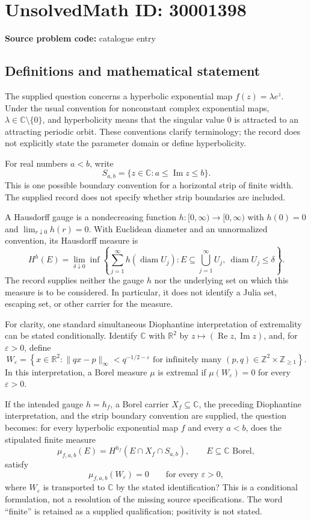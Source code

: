 \documentclass[11pt]{article}
\newcommand{\Z}{\mathbb{Z}}
\newcommand{\R}{\mathbb{R}}
\newcommand{\C}{\mathbb{C}}
\begin{document}
\section*{UnsolvedMath ID: 30001398}
\textbf{Source problem code:} catalogue entry
\subsection{Definitions and mathematical statement}
The supplied question concerns a hyperbolic exponential map \(f(z)=\lambda e^z\). Under the usual convention for nonconstant complex exponential maps, \(\lambda\in\C\setminus\{0\}\), and hyperbolicity means that the singular value \(0\) is attracted to an attracting periodic orbit. These conventions clarify terminology; the record does not explicitly state the parameter domain or define hyperbolicity.

For real numbers \(a<b\), write
\[
S_{a,b}=\{z\in\C:a\leq\operatorname{Im}z\leq b\}.
\]
This is one possible boundary convention for a horizontal strip of finite width. The supplied record does not specify whether strip boundaries are included.

A Hausdorff gauge is a nondecreasing function \(h:[0,\infty)\to[0,\infty)\) with \(h(0)=0\) and \(\lim_{r\downarrow0}h(r)=0\). With Euclidean diameter and an unnormalized convention, its Hausdorff measure is
\[
H^h(E)=\lim_{\delta\downarrow0}\inf\left\{\sum_{j=1}^{\infty}h(\operatorname{diam}U_j):E\subseteq\bigcup_{j=1}^{\infty}U_j,\ \operatorname{diam}U_j\leq\delta\right\}.
\]
The record supplies neither the gauge \(h\) nor the underlying set on which this measure is to be considered. In particular, it does not identify a Julia set, escaping set, or other carrier for the measure.

For clarity, one standard simultaneous Diophantine interpretation of extremality can be stated conditionally. Identify \(\C\) with \(\R^2\) by \(z\mapsto(\operatorname{Re}z,\operatorname{Im}z)\), and, for \(\varepsilon>0\), define
\[
W_\varepsilon=\left\{x\in\R^2:\|qx-p\|_\infty<q^{-1/2-\varepsilon}\text{ for infinitely many }(p,q)\in\Z^2\times\Z_{\geq1}\right\}.
\]
In this interpretation, a Borel measure \(\mu\) is extremal if \(\mu(W_\varepsilon)=0\) for every \(\varepsilon>0\).

If the intended gauge \(h=h_f\), a Borel carrier \(X_f\subseteq\C\), the preceding Diophantine interpretation, and the strip boundary convention are supplied, the question becomes: for every hyperbolic exponential map \(f\) and every \(a<b\), does the stipulated finite measure
\[
\mu_{f,a,b}(E)=H^{h_f}(E\cap X_f\cap S_{a,b}),\qquad E\subseteq\C\text{ Borel},
\]
satisfy
\[
\mu_{f,a,b}(W_\varepsilon)=0\qquad\text{for every }\varepsilon>0,
\]
where \(W_\varepsilon\) is transported to \(\C\) by the stated identification? This is a conditional formulation, not a resolution of the missing source specifications. The word ``finite'' is retained as a supplied qualification; positivity is not stated.
\end{document}
